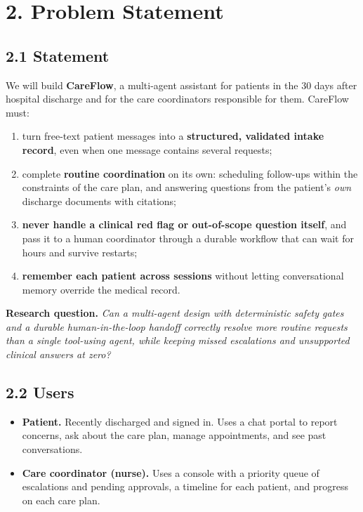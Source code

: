 \documentclass[11pt,a4paper]{article}
\begin{document}
\section*{2. Problem Statement}

\subsection*{2.1 Statement}

We will build \textbf{CareFlow}, a multi-agent assistant for patients in the 30 days after hospital discharge and for the care coordinators responsible for them. CareFlow must:
\begin{enumerate}
    \item turn free-text patient messages into a \textbf{structured, validated intake record}, even when one message contains several requests;
    \item complete \textbf{routine coordination} on its own: scheduling follow-ups within the constraints of the care plan, and answering questions from the patient's \emph{own} discharge documents with citations;
    \item \textbf{never handle a clinical red flag or out-of-scope question itself}, and pass it to a human coordinator through a durable workflow that can wait for hours and survive restarts;
    \item \textbf{remember each patient across sessions} without letting conversational memory override the medical record.
\end{enumerate}

\textbf{Research question.} \emph{Can a multi-agent design with deterministic safety gates and a durable human-in-the-loop handoff correctly resolve more routine requests than a single tool-using agent, while keeping missed escalations and unsupported clinical answers at zero?}

\subsection*{2.2 Users}

\begin{itemize}
    \item \textbf{Patient.} Recently discharged and signed in. Uses a chat portal to report concerns, ask about the care plan, manage appointments, and see past conversations.
    \item \textbf{Care coordinator (nurse).} Uses a console with a priority queue of escalations and pending approvals, a timeline for each patient, and progress on each care plan.
\end{itemize}
\end{document}
